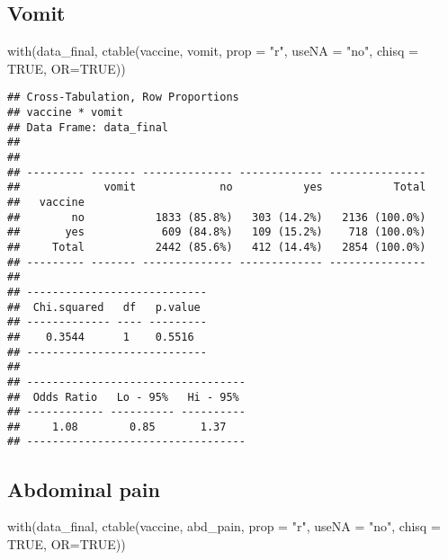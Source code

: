 \documentclass[
]{article}
\newenvironment{Shaded}{\begin{snugshade}}{\end{snugshade}}
\newcommand{\AttributeTok}[1]{\textcolor[rgb]{0.77,0.63,0.00}{#1}}
\newcommand{\ConstantTok}[1]{\textcolor[rgb]{0.00,0.00,0.00}{#1}}
\newcommand{\FunctionTok}[1]{\textcolor[rgb]{0.00,0.00,0.00}{#1}}
\newcommand{\NormalTok}[1]{#1}
\newcommand{\StringTok}[1]{\textcolor[rgb]{0.31,0.60,0.02}{#1}}
\begin{document}
\hypertarget{vomit}{%
\subsection{Vomit}\label{vomit}}

\begin{Shaded}
\begin{Highlighting}[]
\FunctionTok{with}\NormalTok{(data\_final, }\FunctionTok{ctable}\NormalTok{(vaccine, vomit, }\AttributeTok{prop =} \StringTok{"r"}\NormalTok{, }\AttributeTok{useNA =} \StringTok{"no"}\NormalTok{, }\AttributeTok{chisq =} \ConstantTok{TRUE}\NormalTok{, }\AttributeTok{OR=}\ConstantTok{TRUE}\NormalTok{))}
\end{Highlighting}
\end{Shaded}

\begin{verbatim}
## Cross-Tabulation, Row Proportions  
## vaccine * vomit  
## Data Frame: data_final  
## 
## 
## --------- ------- -------------- ------------- ---------------
##             vomit             no           yes           Total
##   vaccine                                                     
##        no           1833 (85.8%)   303 (14.2%)   2136 (100.0%)
##       yes            609 (84.8%)   109 (15.2%)    718 (100.0%)
##     Total           2442 (85.6%)   412 (14.4%)   2854 (100.0%)
## --------- ------- -------------- ------------- ---------------
## 
## ----------------------------
##  Chi.squared   df   p.value 
## ------------- ---- ---------
##    0.3544      1    0.5516  
## ----------------------------
## 
## ----------------------------------
##  Odds Ratio   Lo - 95%   Hi - 95% 
## ------------ ---------- ----------
##     1.08        0.85       1.37   
## ----------------------------------
\end{verbatim}

\hypertarget{abdominal-pain}{%
\subsection{Abdominal pain}\label{abdominal-pain}}

\begin{Shaded}
\begin{Highlighting}[]
\FunctionTok{with}\NormalTok{(data\_final, }\FunctionTok{ctable}\NormalTok{(vaccine, abd\_pain, }\AttributeTok{prop =} \StringTok{"r"}\NormalTok{, }\AttributeTok{useNA =} \StringTok{"no"}\NormalTok{, }\AttributeTok{chisq =} \ConstantTok{TRUE}\NormalTok{, }\AttributeTok{OR=}\ConstantTok{TRUE}\NormalTok{))}
\end{Highlighting}
\end{Shaded}
\end{document}
